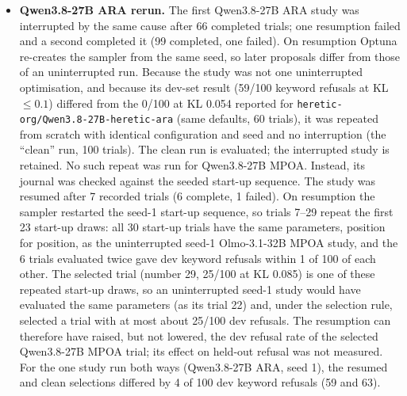 \begin{itemize}
\item \textbf{Qwen3.8-27B ARA rerun.} The first Qwen3.8-27B ARA study was
  interrupted by the same cause after 66 completed trials; one resumption
  failed and a second completed it (99 completed, one failed). On resumption
  Optuna re-creates the sampler from the same seed, so later proposals differ
  from those of an uninterrupted run. Because the study was not one
  uninterrupted optimisation, and because its dev-set result (59/100 keyword
  refusals at KL $\le 0.1$) differed from the 0/100 at KL 0.054 reported for
  \texttt{heretic-org/Qwen3.8-27B-heretic-ara} (same defaults, 60 trials), it
  was repeated from scratch with identical
  configuration and seed and no interruption (the ``clean'' run, 100 trials).
  The clean run is evaluated; the interrupted study is retained. No such repeat
  was run for Qwen3.8-27B MPOA. Instead, its journal was checked against the
  seeded start-up sequence. The study was resumed after 7 recorded trials (6
  complete, 1 failed). On resumption the sampler restarted the seed-1 start-up
  sequence, so trials 7--29 repeat the first 23 start-up draws: all 30 start-up
  trials have the same parameters, position for position, as the uninterrupted
  seed-1 Olmo-3.1-32B MPOA study, and the 6 trials evaluated twice gave dev
  keyword refusals within 1 of 100 of each other. The selected trial (number 29,
  25/100 at KL 0.085) is one of these repeated start-up draws, so an
  uninterrupted seed-1 study would have evaluated the same parameters (as its
  trial 22) and, under the selection rule, selected a trial with at most about
  25/100 dev refusals. The resumption can therefore have raised, but not lowered,
  the dev refusal rate of the selected Qwen3.8-27B MPOA trial; its effect on
  held-out refusal was not measured. For the one study run both ways
  (Qwen3.8-27B ARA, seed 1), the resumed and clean selections differed by 4 of
  100 dev keyword refusals (59 and 63).

\end{itemize}

